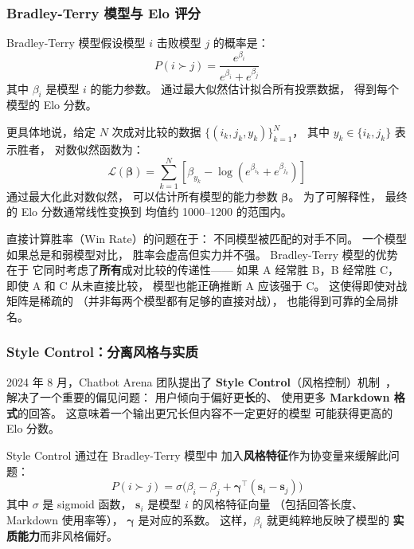 \subsubsection{Bradley-Terry 模型与 Elo 评分}

Bradley-Terry 模型假设模型 $i$ 击败模型 $j$ 的概率是：
\begin{equation}
  P(i \succ j) = \frac{e^{\beta_i}}{e^{\beta_i} + e^{\beta_j}}
  \label{eq:bt-model}
\end{equation}
其中 $\beta_i$ 是模型 $i$ 的能力参数。
通过最大似然估计拟合所有投票数据，
得到每个模型的 Elo 分数。

更具体地说，给定 $N$ 次成对比较的数据
$\{(i_k, j_k, y_k)\}_{k=1}^{N}$，
其中 $y_k \in \{i_k, j_k\}$ 表示胜者，
对数似然函数为：
\begin{equation}
  \mathcal{L}(\boldsymbol{\beta}) = \sum_{k=1}^{N}
  \left[\beta_{y_k} - \log\left(e^{\beta_{i_k}} + e^{\beta_{j_k}}\right)\right]
  \label{eq:bt-loglik}
\end{equation}
通过最大化此对数似然，
可以估计所有模型的能力参数 $\boldsymbol{\beta}$。
为了可解释性，
最终的 Elo 分数通常线性变换到
均值约 1000--1200 的范围内。

\begin{whybox}
直接计算胜率（Win Rate）的问题在于：
不同模型被匹配的对手不同。
一个模型如果总是和弱模型对比，
胜率会虚高但实力并不强。
Bradley-Terry 模型的优势在于
它同时考虑了\textbf{所有}成对比较的传递性——
如果 A 经常胜 B，B 经常胜 C，
即使 A 和 C 从未直接比较，
模型也能正确推断 A 应该强于 C。
这使得即使对战矩阵是稀疏的
（并非每两个模型都有足够的直接对战），
也能得到可靠的全局排名。
\end{whybox}

\subsubsection{Style Control：分离风格与实质}

2024 年 8 月，Chatbot Arena 团队提出了
\textbf{Style Control}（风格控制）机制~\cite{li2024stylecontrol}，
解决了一个重要的偏见问题：
用户倾向于偏好更\textbf{长}的、
使用更多 \textbf{Markdown 格式}的回答。
这意味着一个输出更冗长但内容不一定更好的模型
可能获得更高的 Elo 分数。

Style Control 通过在 Bradley-Terry 模型中
加入\textbf{风格特征}作为协变量来缓解此问题：
\begin{equation}
  P(i \succ j) = \sigma\bigl(\beta_i - \beta_j
  + \boldsymbol{\gamma}^\top(\mathbf{s}_i - \mathbf{s}_j)\bigr)
  \label{eq:style-control}
\end{equation}
其中 $\sigma$ 是 sigmoid 函数，
$\mathbf{s}_i$ 是模型 $i$ 的风格特征向量
（包括回答长度、Markdown 使用率等），
$\boldsymbol{\gamma}$ 是对应的系数。
这样，$\beta_i$ 就更纯粹地反映了模型的
\textbf{实质能力}而非风格偏好。

